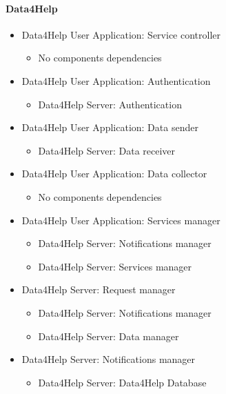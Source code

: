 		\paragraph{Data4Help}
		\begin{itemize}

			\item{Data4Help User Application: Service controller}
			\begin{itemize}\item{No components dependencies}\end{itemize}

			\item{Data4Help User Application: Authentication}
			\begin{itemize}\item{Data4Help Server: Authentication}\end{itemize}

			\item{Data4Help User Application: Data sender}
			\begin{itemize}\item{Data4Help Server: Data receiver}\end{itemize}

			\item{Data4Help User Application: Data collector}
			\begin{itemize}\item{No components dependencies}\end{itemize}

			\item{Data4Help User Application: Services manager}
			\begin{itemize}\item{Data4Help Server: Notifications manager}\item{Data4Help Server: Services manager}\end{itemize}

			\item{Data4Help Server: Request manager}
			\begin{itemize}\item{Data4Help Server: Notifications manager}\item{Data4Help Server: Data manager}\end{itemize}

			\item{Data4Help Server: Notifications manager}
			\begin{itemize}\item{Data4Help Server: Data4Help Database}\end{itemize}


\end{itemize}

